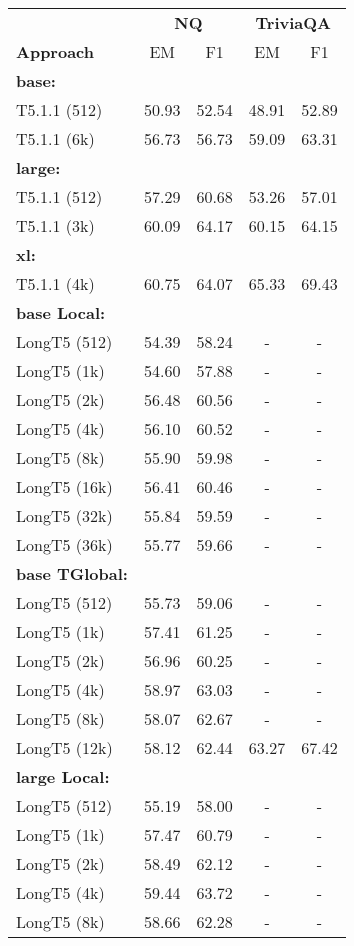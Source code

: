 \documentclass[11pt]{article}
\begin{document}
\begin{table}
\small
\centering
\begin{tabular}{lcccc}
\toprule
& \multicolumn{2}{c}{\textbf{NQ}} & \multicolumn{2}{c}{\textbf{TriviaQA}} \\
\textbf{Approach} & EM & F1 & EM & F1\\
\midrule
{\bf base:} \\
T5.1.1 (512) & 50.93 & 52.54 & 48.91 & 52.89 \\
T5.1.1 (6k) & 56.73 & 56.73 & 59.09 & 63.31 \\
{\bf large:} \\
T5.1.1 (512) & 57.29 & 60.68 & 53.26 & 57.01 \\
T5.1.1 (3k) & 60.09 & 64.17 & 60.15 & 64.15 \\
{\bf xl:} \\
T5.1.1 (4k) & 60.75 & 64.07 & 65.33 & 69.43 \\
\midrule
{\bf base Local:} \\
LongT5 (512) & 54.39 & 58.24 & - & - \\
LongT5 (1k) & 54.60 & 57.88 & - & - \\
LongT5 (2k) & 56.48 & 60.56 & - & - \\
LongT5 (4k) & 56.10 & 60.52 & - & - \\
LongT5 (8k) & 55.90 & 59.98 & - & - \\
LongT5 (16k) & 56.41 & 60.46 & - & - \\
LongT5 (32k) & 55.84 & 59.59 & - & - \\
LongT5 (36k) & 55.77 & 59.66 & - & - \\
{\bf base TGlobal:} \\
LongT5 (512) & 55.73 & 59.06 & - & - \\
LongT5 (1k) & 57.41 & 61.25 & - & - \\
LongT5 (2k) & 56.96 & 60.25 & - & - \\
LongT5 (4k) & 58.97 & 63.03 & - & - \\
LongT5 (8k) & 58.07 & 62.67 & - & - \\
LongT5 (12k) & 58.12 & 62.44 & 63.27 & 67.42 \\
{\bf large Local:} \\
LongT5 (512) & 55.19 & 58.00 & - & - \\
LongT5 (1k) & 57.47 & 60.79 & - & - \\
LongT5 (2k) & 58.49 & 62.12 & - & - \\
LongT5 (4k) & 59.44 & 63.72 & - & - \\
LongT5 (8k) & 58.66 & 62.28 & - & - \\

\end{tabular}
\end{table}
\end{document}
